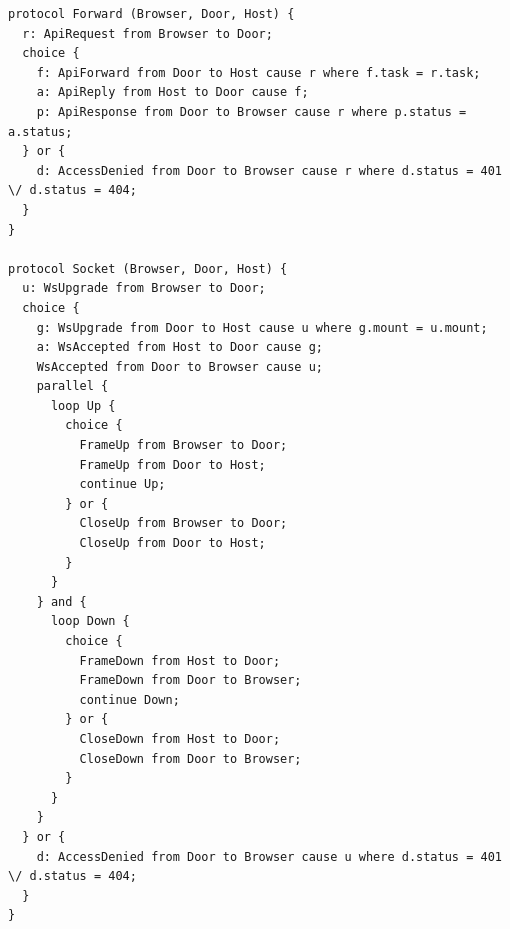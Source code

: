 \begin{Verbatim}[fontsize=\small]
protocol Forward (Browser, Door, Host) {
  r: ApiRequest from Browser to Door;
  choice {
    f: ApiForward from Door to Host cause r where f.task = r.task;
    a: ApiReply from Host to Door cause f;
    p: ApiResponse from Door to Browser cause r where p.status = a.status;
  } or {
    d: AccessDenied from Door to Browser cause r where d.status = 401 \/ d.status = 404;
  }
}

protocol Socket (Browser, Door, Host) {
  u: WsUpgrade from Browser to Door;
  choice {
    g: WsUpgrade from Door to Host cause u where g.mount = u.mount;
    a: WsAccepted from Host to Door cause g;
    WsAccepted from Door to Browser cause u;
    parallel {
      loop Up {
        choice {
          FrameUp from Browser to Door;
          FrameUp from Door to Host;
          continue Up;
        } or {
          CloseUp from Browser to Door;
          CloseUp from Door to Host;
        }
      }
    } and {
      loop Down {
        choice {
          FrameDown from Host to Door;
          FrameDown from Door to Browser;
          continue Down;
        } or {
          CloseDown from Host to Door;
          CloseDown from Door to Browser;
        }
      }
    }
  } or {
    d: AccessDenied from Door to Browser cause u where d.status = 401 \/ d.status = 404;
  }
}
\end{Verbatim}
